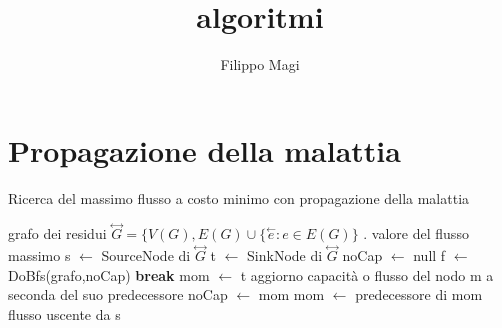 \documentclass{article}
\title{algoritmi}
\author{Filippo Magi }
\begin{document}
\section{Propagazione della malattia}
\begin{algorithm}
\caption{Ricerca del massimo flusso a costo minimo con propagazione della malattia}
\begin{algorithmic}
\REQUIRE grafo dei residui $\overset{\leftrightarrow}{G} = \{V(G),E(G) \cup \{ \overset{\leftarrow}{e} : e \in E(G) \}$ .
\ENSURE valore del flusso massimo
\STATE s $\leftarrow$ SourceNode di $\overset{\leftrightarrow}{G}$
\STATE t $\leftarrow$ SinkNode di $\overset{\leftrightarrow}{G}$
\STATE noCap $\leftarrow$ null
\LOOP
\STATE f $\leftarrow$ DoBfs(grafo,noCap)
\STATE \textbf{break}
\ENDIF
\STATE mom $\leftarrow$ t
\STATE aggiorno capacità o flusso del nodo m a seconda del suo predecessore
\STATE noCap $\leftarrow$ mom
\ENDIF
\STATE mom $\leftarrow$ predecessore di mom
\ENDWHILE
\ENDLOOP
\RETURN flusso uscente da s
\end{algorithmic}
\end{algorithm}
\end{document}
